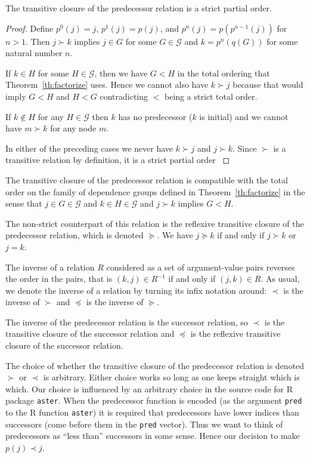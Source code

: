 \begin{theorem} \label{th:transitive-closure}
The transitive closure of the predecessor relation is a strict partial order.
\end{theorem}
\begin{proof}
Define $p^0(j) = j$, $p^1(j) = p(j)$, and $p^n(j) = p(p^{n - 1}(j))$ for
$n > 1$.  Then $j \succ k$ implies $j \in G$ for some $G \in \mathcal{G}$ and
$k = p^n(q(G))$ for some natural number $n$.

If $k \in H$ for some $H \in \mathcal{G}$,
then we have $G < H$ in the total ordering
that Theorem~\ref{th:factorize} uses.
Hence we cannot also have $k \succ j$ because that would imply $G < H$
and $H < G$ contradicting $<$ being a strict total order.

If $k \notin H$ for any $H \in \mathcal{G}$ then $k$ has no predecessor
($k$ is initial) and we cannot have $m \succ k$ for any node $m$.

In either of the preceding cases we never have $k \succ j$ and $j \succ k$.
Since $\succ$ is a transitive relation by definition, it is
a strict partial order \citep[Section~14]{halmos-set-theory}
\end{proof}
\begin{corollary} \label{cor:compatible}
The transitive closure of the predecessor relation is compatible with
the total order on the family of dependence groups defined
in Theorem~\ref{th:factorize} in the sense that
$j \in G \in \mathcal{G}$ and $k \in H \in \mathcal{G}$ and $j \succ k$
implies $G < H$.
\end{corollary}

The non-strict counterpart of this relation
is the reflexive transitive closure of the predecessor relation,
which is denoted $\succeq$.
We have $j \succeq k$ if and only if $j \succ k$ or $j = k$.

The inverse of a relation $R$ considered as a set of argument-value pairs
reverses the order in the pairs, that is $(k, j) \in R^{- 1}$ if and only
if $(j, k) \in R$.
As usual, we denote the inverse of a relation by turning its infix notation
around: $\prec$ is the inverse of $\succ$ and $\preceq$ is the inverse
of $\succeq$.

The inverse of the predecessor relation is the successor relation,
so $\prec$ is the transitive closure of the successor relation
and $\preceq$ is the reflexive transitive closure of the successor relation.

The choice of whether the transitive closure of the predecessor relation
is denoted $\succ$ or $\prec$ is arbitrary.  Either choice works so long
as one keeps straight which is which.  Our choice is influenced by an
arbitrary choice in the source code for R package \texttt{aster}.  When
the predecessor function is encoded (as the argument \texttt{pred} to the
R function \texttt{aster}) it is required that predecessors have lower indices
than successors (come before them in the \texttt{pred} vector).  Thus we
want to think of predecessors as ``less than'' successors in some sense.
Hence our decision to make $p(j) \prec j$.


